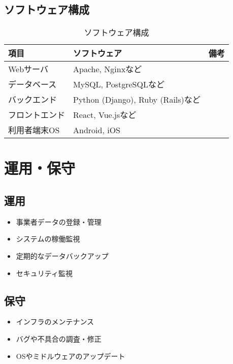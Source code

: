 \documentclass{docs}
\begin{document}
\subsection{ソフトウェア構成}
\begin{table}[H]
    \centering
    \caption{ソフトウェア構成}
    \label{tab:software}
    \begin{tabularx}{0.9\textwidth}{|l|X|X|}
        \hline
        \textbf{項目} & \textbf{ソフトウェア} & \textbf{備考} \\ \hline
        Webサーバ & Apache, Nginxなど & \\ \hline
        データベース & MySQL, PostgreSQLなど & \\ \hline
        バックエンド & Python (Django), Ruby (Rails)など & \\ \hline
        フロントエンド & React, Vue.jsなど & \\ \hline
        利用者端末OS & Android, iOS & \\ \hline
    \end{tabularx}
\end{table}

\section{運用・保守}
\subsection{運用}
\begin{itemize}
    \item 事業者データの登録・管理
    \item システムの稼働監視
    \item 定期的なデータバックアップ
    \item セキュリティ監視
\end{itemize}

\subsection{保守}
\begin{itemize}
    \item インフラのメンテナンス
    \item バグや不具合の調査・修正
    \item OSやミドルウェアのアップデート
\end{itemize}
\end{document}
